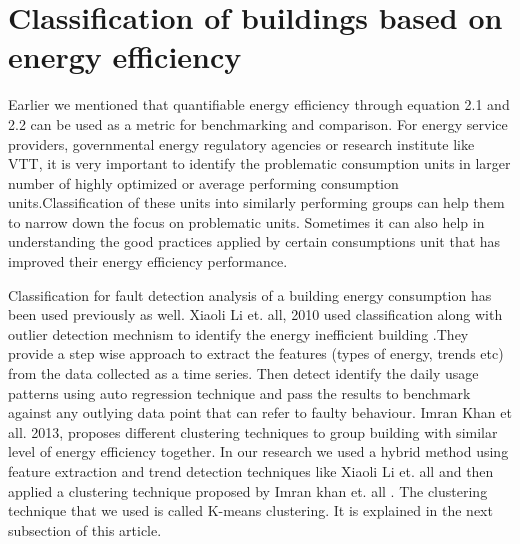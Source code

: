 \section{Classification of buildings based on energy efficiency}\label{classify}

Earlier we mentioned that quantifiable energy efficiency through equation 2.1 and 2.2 can be used as a metric for benchmarking and comparison. For energy service providers, governmental energy regulatory agencies or research institute like VTT, it is very important to identify the problematic consumption units in larger number of highly optimized or average performing consumption units.Classification of these units into similarly performing groups can help them to narrow down the focus on problematic units. Sometimes it can also help in understanding the good practices applied by certain consumptions unit that has improved their energy efficiency performance.
  
Classification for fault detection analysis of a building energy consumption has been used previously as well. Xiaoli Li et. all, 2010 used classification along with outlier detection mechnism to identify the energy inefficient building \cite{li2010classification}.They provide a step wise approach to extract the features (types of energy, trends etc) from the data collected as a time series. Then detect identify the daily usage patterns using auto regression technique and pass the results to benchmark against any outlying data point that can refer to faulty behaviour. Imran Khan et all. 2013, proposes different clustering techniques to group building with similar level of energy efficiency together\cite{khan2013fault}. In our research we used a hybrid method using feature extraction and trend detection techniques like Xiaoli Li et. all\cite{li2010classification} and then applied a clustering technique proposed by Imran khan et. all \cite{khan2013fault}. The clustering technique that we used is called K-means clustering. It is explained in the next subsection of this article. 

